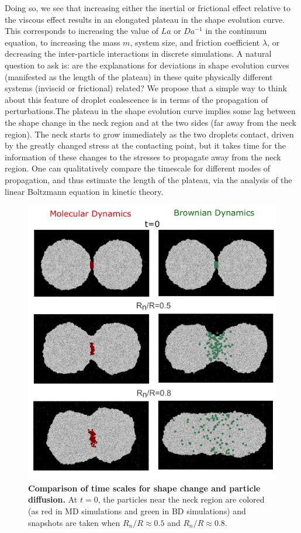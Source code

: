 \documentclass[%
reprint,
amsmath,amssymb,
aps,
]{revtex4-2}
\begin{document}
	Doing so, we see that increasing either the inertial or frictional effect relative to the viscous effect results in an elongated plateau in the shape evolution curve. This corresponds to increasing the value of $La$ or $Da^{-1}$ in the continuum equation, to increasing the mass $m$, system size, and friction coefficient $\lambda$, or decreasing the inter-particle interactions in discrete simulations. A natural question to ask is: are the explanations for deviations in shape evolution curves (manifested as the length of the plateau) in these quite physically different systems (inviscid or frictional) related? We propose that a simple way to think about this feature of droplet coalescence is in terms of the propagation of perturbations.The plateau in the shape evolution curve implies some lag between the shape change in the neck region and at the two sides (far away from the neck region). The neck starts to grow immediately as the two droplets contact, driven by the greatly changed stress at the contacting point, but it takes time for the information of these changes to the stresses to propagate away from the neck region. One can qualitatively compare the timescale for different modes of propagation, and thus estimate the length of the plateau, via the analysis of the linear Boltzmann equation in kinetic theory. 
	
	\begin{figure}[htb]
		\centering
		\includegraphics[width=\columnwidth]{Figure5.pdf}
		\caption{\textbf{Comparison of time scales for shape change and particle diffusion.} At $t=0$, the particles near the neck region are colored (as red in MD simulations and green in BD simulations) and snapshots are taken when $R_n/R\approx 0.5$ and $R_n/R\approx 0.8$.}
		\label{fig:diffuse}
	\end{figure}
	
\end{document}
